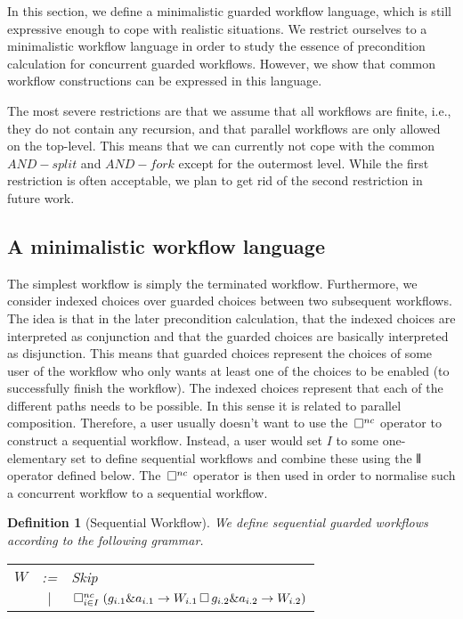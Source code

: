 \documentclass[11pt]{article}
\newtheorem{definition}{Definition}
\begin{document}
In this section, we define a minimalistic guarded workflow language, which is still expressive enough to cope with realistic situations. We restrict ourselves to a minimalistic workflow language in order to study the essence of precondition calculation for concurrent guarded workflows. However, we show that common workflow constructions can be expressed in this language. 

The most severe restrictions are that we assume that all workflows are finite, i.e., they do not contain any recursion, and that parallel workflows are only allowed on the top-level. This means that we can currently not cope with the common $AND-split$ and $AND-fork$ except for the outermost level. While the first restriction is often acceptable, we plan to get rid of the second restriction in future work. 

\subsection{A minimalistic workflow language}

The simplest workflow is simply the terminated workflow. Furthermore, we consider indexed choices over guarded choices between two subsequent workflows. The idea is that in the later precondition calculation, that the indexed choices are interpreted as conjunction and that the guarded choices are basically interpreted as disjunction. This means that guarded choices represent the choices of some user of the workflow who only wants at least one of the choices to be enabled (to successfully finish the workflow). The indexed choices represent that each of the different paths needs to be possible. In this sense it is related to parallel composition. Therefore, a user usually doesn't want to use the $\, \Box^{nc}$ operator to construct a sequential workflow. Instead, a user would set $I$ to some one-elementary set to define sequential workflows and combine these using the $\interleave$ operator defined below. The $\, \Box^{nc}$ operator is then used in order to normalise such a concurrent workflow to a sequential workflow.

\begin{definition}[Sequential Workflow]
We define sequential guarded workflows according to the following grammar.

\begin{tabular}{l c l}
  $W$ & :=  & Skip \\
              & $|$ & $\, \Box^{nc}_{i \in I} \; ( g_{i.1} \& a_{i.1} \rightarrow W_{i.1} 
                                           \, \Box \, g_{i.2} \& a_{i.2} \rightarrow W_{i.2} )$ \\
\end{tabular}
\end{definition}
\end{document}
